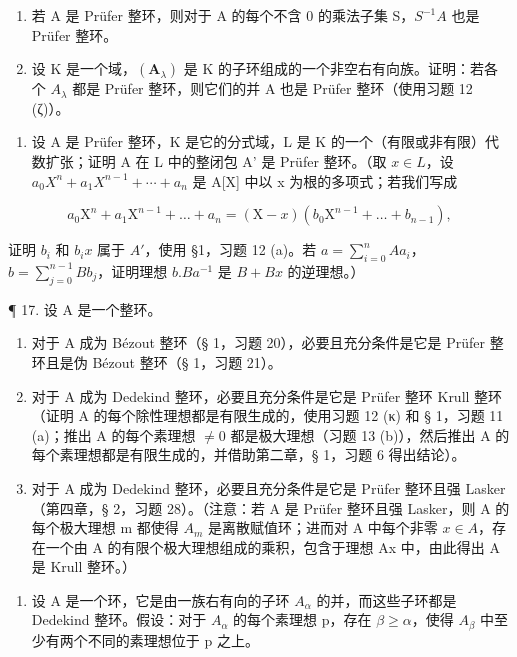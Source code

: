 \begin{enumerate}
\def\labelenumi{(\alph{enumi})}
\setcounter{enumi}{1}
\item
  若 A 是 Prüfer 整环，则对于 A 的每个不含 0 的乘法子集 S，\(S^{-1}A\) 也是 Prüfer 整环。
\item
  设 K 是一个域，\((\mathbf{A}_{\lambda})\) 是 K 的子环组成的一个非空右有向族。证明：若各个 \(A_{\lambda}\) 都是 Prüfer 整环，则它们的并 A 也是 Prüfer 整环（使用习题 12 (ζ)）。
\end{enumerate}

\begin{enumerate}
\def\labelenumi{\arabic{enumi}.}
\setcounter{enumi}{15}
\tightlist
\item
  设 A 是 Prüfer 整环，K 是它的分式域，L 是 K 的一个（有限或非有限）代数扩张；证明 A 在 L 中的整闭包 A' 是 Prüfer 整环。（取 \(x \in L\)，设 \(a_{0}X^{n} + a_{1}X^{n-1} + \cdots + a_{n}\) 是 A{[}X{]} 中以 x 为根的多项式；若我们写成
\end{enumerate}

\[
a _ {0} \mathrm{X} ^ {n} + a _ {1} \mathrm{X} ^ {n - 1} + \dots + a _ {n} = (\mathrm{X} - x) (b _ {0} \mathrm{X} ^ {n - 1} + \dots + b _ {n - 1}),
\]

  证明 \(b_{i}\) 和 \(b_{i}x\) 属于 \(A'\)，使用 §1，习题 12 (a)。若 \(a = \sum_{i=0}^{n} A a_{i}\)，\(b = \sum_{j=0}^{n-1} B b_{j}\)，证明理想 \(b.B a^{-1}\) 是 \(B + B x\) 的逆理想。）

¶ 17. 设 A 是一个整环。

\begin{enumerate}
\def\labelenumi{(\alph{enumi})}
\item
  对于 A 成为 Bézout 整环（§ 1，习题 20），必要且充分条件是它是 Prüfer 整环且是伪 Bézout 整环（§ 1，习题 21）。
\item
  对于 A 成为 Dedekind 整环，必要且充分条件是它是 Prüfer 整环 Krull 整环（证明 A 的每个除性理想都是有限生成的，使用习题 12 (κ) 和 § 1，习题 11 (a)；推出 A 的每个素理想 \(\neq 0\) 都是极大理想（习题 13 (b)），然后推出 A 的每个素理想都是有限生成的，并借助第二章，§ 1，习题 6 得出结论）。
\item
  对于 A 成为 Dedekind 整环，必要且充分条件是它是 Prüfer 整环且强 Lasker（第四章，§ 2，习题 28）。（注意：若 A 是 Prüfer 整环且强 Lasker，则 A 的每个极大理想 m 都使得 \(A_{m}\) 是离散赋值环；进而对 A 中每个非零 \(x \in A\)，存在一个由 A 的有限个极大理想组成的乘积，包含于理想 Ax 中，由此得出 A 是 Krull 整环。）
\end{enumerate}

\begin{enumerate}
\def\labelenumi{\arabic{enumi}.}
\setcounter{enumi}{17}
\tightlist
\item
  设 A 是一个环，它是由一族右有向的子环 \(A_{\alpha}\) 的并，而这些子环都是 Dedekind 整环。假设：对于 \(A_{\alpha}\) 的每个素理想 p，存在 \(\beta \geqslant \alpha\)，使得 \(A_{\beta}\) 中至少有两个不同的素理想位于 p 之上。
\end{enumerate}

